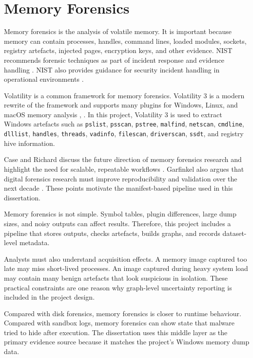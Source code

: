 \section{Memory Forensics}

Memory forensics is the analysis of volatile memory. It is important because memory can contain processes, handles, command lines, loaded modules, sockets, registry artefacts, injected pages, encryption keys, and other evidence. NIST recommends forensic techniques as part of incident response and evidence handling \cite{nist2006sp80086}. NIST also provides guidance for security incident handling in operational environments \cite{nist2012sp80061}.

Volatility is a common framework for memory forensics. Volatility 3 is a modern rewrite of the framework and supports many plugins for Windows, Linux, and macOS memory analysis \cite{volatility3docs}, \cite{volatility3github}. In this project, Volatility 3 is used to extract Windows artefacts such as \texttt{pslist}, \texttt{psscan}, \texttt{pstree}, \texttt{malfind}, \texttt{netscan}, \texttt{cmdline}, \texttt{dlllist}, \texttt{handles}, \texttt{threads}, \texttt{vadinfo}, \texttt{filescan}, \texttt{driverscan}, \texttt{ssdt}, and registry hive information.

Case and Richard discuss the future direction of memory forensics research and highlight the need for scalable, repeatable workflows \cite{case2017memory}. Garfinkel also argues that digital forensics research must improve reproducibility and validation over the next decade \cite{garfinkel2010digital}. These points motivate the manifest-based pipeline used in this dissertation.

Memory forensics is not simple. Symbol tables, plugin differences, large dump sizes, and noisy outputs can affect results. Therefore, this project includes a pipeline that stores outputs, checks artefacts, builds graphs, and records dataset-level metadata.

Analysts must also understand acquisition effects. A memory image captured too late may miss short-lived processes. An image captured during heavy system load may contain many benign artefacts that look suspicious in isolation. These practical constraints are one reason why graph-level uncertainty reporting is included in the project design.

Compared with disk forensics, memory forensics is closer to runtime behaviour. Compared with sandbox logs, memory forensics can show state that malware tried to hide after execution. The dissertation uses this middle layer as the primary evidence source because it matches the project's Windows memory dump data.

